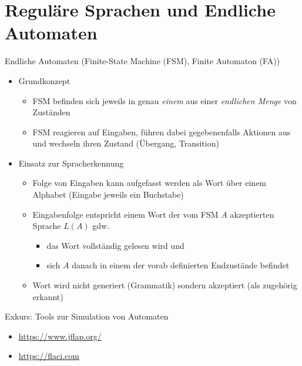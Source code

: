 \section{Reguläre Sprachen und Endliche Automaten}


\begin{frame}{Endliche Automaten (Finite-State Machine (FSM), Finite Automaton (FA))}
	\begin{itemize}
		\item Grundkonzept
		\begin{itemize}
			\item FSM befinden sich jeweils in genau \emph{einem} aus einer \emph{endlichen Menge} von Zuständen
			\item FSM reagieren auf Eingaben, führen dabei gegebenenfalls Aktionen aus und wechseln ihren Zustand (Übergang, Transition)
		\end{itemize}
		\item Einsatz zur Spracherkennung
		\begin{itemize}
			\item Folge von Eingaben kann aufgefasst werden als Wort über einem Alphabet (Eingabe jeweils ein Buchstabe)
			\item Eingabenfolge entspricht einem Wort der vom FSM $A$ akzeptierten Sprache $L(A)$ gdw.
			\begin{itemize}
				\item das Wort vollständig gelesen wird und
				\item sich $A$ danach in einem der vorab definierten Endzustände befindet
			\end{itemize}
			\item Wort wird nicht generiert (Grammatik) sondern akzeptiert (als zugehörig erkannt)
		\end{itemize}
	\end{itemize}
\end{frame}

\begin{frame}{Exkurs: Tools zur Simulation von Automaten}
	\begin{itemize}
		\item \url{https://www.jflap.org/} 
		\item \url{https://flaci.com}
	\end{itemize}
\end{frame}

